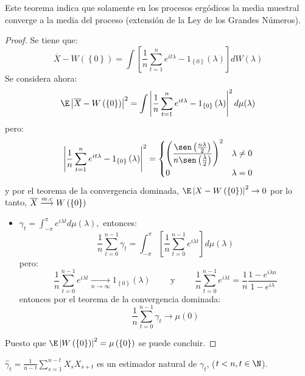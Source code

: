 Este teorema indica que solamente en los procesos erg\'{o}dicos la media muestral converge a la media del proceso (extensi\'{o}n de la Ley de los Grandes N\'{u}meros).

\begin{proof}
 Se tiene que:
\[
\overline{X}-W\left( \left\{ 0 \right\} \right)=\int {\left[ 
\frac{1}{n}\sum_{t=1}^n e^{it\lambda } -1_{\left\{ 0 \right\}}\left( 
\lambda \right) \right]dW(\lambda )} 
\]
Se considera ahora:
\[
\E\left| \overline{X}-W\left( \left\{ 0 \right\} \right) \right|^{2}=\int {\left| 
\frac{1}{n}\sum_{t=1}^n e^{it\lambda } -1_{\left\{ 0 \right\}}\left( 
\lambda \right) \right|^{2}d\mu (\lambda )} 
\]
pero:
\[
\left| \frac{1}{n}\sum_{t=1}^n e^{it\lambda } -1_{\left\{ 0 
\right\}}\left( \lambda \right) \right|^{2}
=\begin{cases}\displaystyle
  \left( \frac{\sen\left( \frac{n\lambda }{2} \right)}{n\sen\left( \frac{\lambda }{2} \right)} \right)^{2}& \lambda \neq 0 \\ 
  0 & \lambda=0
 \end{cases}
\]
y por el teorema de la convergencia dominada, $\E\left| X-W\left( \left\{ 0 
\right\} \right) \right|^{2}\to 0$ por lo tanto, $\overline{X}\buildrel {m.c} \over \longrightarrow W\left( \left\{ 0 \right\} \right)$

\begin{itemize}
\item $\gamma_{t} =\int_{-\pi }^\pi {e^{i\lambda t}d\mu \left( \lambda \right)} ,$ entonces:
\[
\frac{1}{n}\sum_{t=0}^{n-1} {\gamma_{t} =\int_{-\pi }^\pi 
{\left[ {\frac{1}{n}\sum_{t=0}^{n-1} {e^{i\lambda t}} } \right]d\mu 
\left( \lambda \right)} } 
\]
pero: 
\[
 \frac{1}{n}\sum_{t=0}^{n-1} {e^{i\lambda t}} 
\mathrel{\mathop{\longrightarrow}\limits_{n\to \infty }} 
1_{\left\{ 0 \right\}} \left( \lambda \right)\qquad\text{ y }\qquad \frac{1}{n}\sum_{t=0}^{n-1} 
{e^{i\lambda t}} =\frac{1}{n}\frac{1-e^{i\lambda n}}{1-e^{i\lambda }}
\]
entonces por el teorema de la convergencia dominada: 
\[
\frac{1}{n}\sum_{t=0}^{n-1} {\gamma_{t} } \to \mu (0)
\]
\end{itemize}
Puesto que $\E\left| W\left( \left\{ 0 \right\} \right) \right|^{2}=\mu \left( 
\left\{ 0 \right\} \right)$ se puede concluir.
\end{proof}

\begin{observacion}
  $\displaystyle\widehat{{\gamma }}_{t} =\frac{1}{n-t}\sum_{s=1}^{n-t} {X_{s} X_{s+t} } $ es un estimador natural de $\gamma_{t}$, ($t<n,t\in \N$).
\end{observacion}

